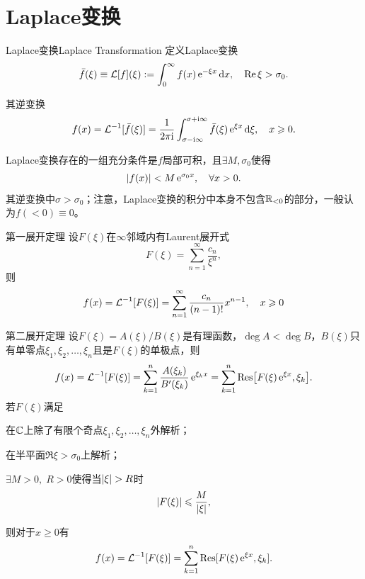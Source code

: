\section{Laplace变换}
\begin{definition}{Laplace变换}{Laplace Transformation}
	定义Laplace变换
	\begin{equation}
		\label{eq:mmp-laplace-transform}
		\bar f(\xi) \equiv \operatorname{\mathcal L}[f](\xi) := \int_0^\infty f(x)\mathop{}\!\mathrm{e}^{-\xi x}\mathop{}\!\mathrm{d} x,\quad\operatorname{Re}\xi > \sigma_0.
	\end{equation}
	
	其逆变换
	\begin{equation}
		\label{eq:mmp-bromwich-inversion}
		f(x) = \operatorname{\mathcal L}^{-1}[\bar f(\xi)] = \frac1{2\pi\mathrm{i}}\int_{\sigma-\mathrm{i}\infty}^{\sigma+\mathrm{i}\infty}\bar f(\xi)\mathop{}\!\mathrm{e}^{\xi x}\mathop{}\!\mathrm{d}\xi,\quad x \geqslant 0.
	\end{equation}
\end{definition}
Laplace变换存在的一组充分条件是$f$局部可积，且$\exists M,\sigma_0$使得
	\[
		\lvert f(x)\rvert < M\mathop{}\!\mathrm{e}^{\sigma_0x},\quad\forall x > 0.
	\]
其逆变换中$\sigma > \sigma_0$；注意，Laplace变换的积分中本身不包含$\mathbb{R}_{<0}$的部分，一般认为$f(< 0) \equiv 0$。
\begin{theorem}{第一展开定理}{}
	设$F(\xi)$在$\infty$邻域内有Laurent展开式
	\[
		F(\xi) = \sum_{n=1}^\infty\frac{c_n}{\xi^n},
	\]
	则
	\begin{equation}
		\label{eq:mmp-laplace-series-inverse}
		f(x) = \operatorname{\mathcal L}^{-1}[F(\xi)] = \sum_{n=1}^\infty\frac{c_n}{(n - 1)!}x^{n-1},\quad x \geqslant 0
	\end{equation}
\end{theorem}
\begin{theorem}{第二展开定理}{}
	设$F(\xi) = A(\xi)/B(\xi)$是有理函数，$\deg A < \deg B$，$B(\xi)$只有单零点$\xi_1,\xi_2,\ldots,\xi_n$且是$F(\xi)$的单极点，则
	\begin{equation}
		\label{eq:mmp-laplace-simple-poles}
		f(x) = \operatorname{\mathcal L}^{-1}[F(\xi)] = \sum_{k=1}^n\frac{A(\xi_k)}{B'(\xi_k)}\mathop{}\!\mathrm{e}^{\xi_kx} = \sum_{k=1}^n\operatorname{Res}\bigl[F(\xi)\mathop{}\!\mathrm{e}^{\xi x},\xi_k\bigr].
	\end{equation}
\tcblower
	若$F(\xi)$满足
	\begin{compactenum}
		\item 在$\mathbb{C}$上除了有限个奇点$\xi_1,\xi_2,\ldots,\xi_n$外解析；
		\item 在半平面$\Re\xi > \sigma_0$上解析；
		\item $\exists M > 0,\;R > 0$使得当$\lvert\xi\rvert > R$时
		\[
			\lvert F(\xi)\rvert \leqslant \frac M{\lvert\xi\rvert},
		\]
	\end{compactenum}
	则对于$x \geqslant 0$有
	\begin{equation}
		\label{eq:mmp-laplace-residue-inversion}
		f(x) = \operatorname{\mathcal L}^{-1}[F(\xi)] = \sum_{k=1}^n\operatorname{Res}[F(\xi)\mathop{}\!\mathrm{e}^{\xi x},\xi_k].
	\end{equation}
\end{theorem}
